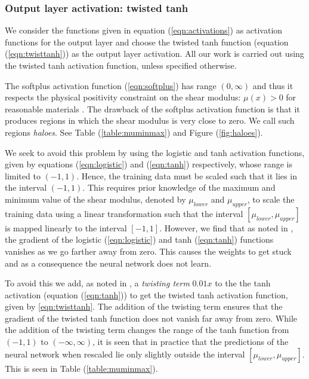 \documentclass[12pt]{article}
\begin{document}
\subsubsection{\label{sect:outputact} Output layer activation: twisted tanh}
We consider the functions given in equation (\ref{eqn:activations}) as activation functions for the output layer and choose the twisted tanh function (equation (\ref{eqn:twisttanh})) as the output layer activation. All our work is carried out using the twisted tanh activation function, unless specified otherwise.

The softplus activation function (\ref{eqn:softplus}) has range $(0,\infty)$ and thus it respects the physical positivity constraint on the shear modulus: $\mu(x)>0$ for reasonable materials \cite{book:segelmathcont}. The drawback of the softplus activation function is that it produces regions in which the shear modulus is very close to zero. We call such regions \textit{haloes}. See Table (\ref{table:muminmax}) and Figure (\ref{fig:haloes}).

We seek to avoid this problem by using the logistic and tanh activation functions, given by equations (\ref{eqn:logistic}) and (\ref{eqn:tanh}) respectively, whose range is limited to $(-1,1)$. Hence, the training data must be scaled such that it lies in the interval $(-1,1)$. This requires prior knowledge of the maximum and minimum value of the shear modulus, denoted by $\mu_{lower}$ and $\mu_{upper}$, to scale the training data using a linear transformation such that the interval $[\mu_{lower},\mu_{upper}]$ is mapped linearly to the interval $[-1,1]$. However, we find that as noted in \cite{bookchap:lecun98b}, the gradient of the logistic (\ref{eqn:logistic}) and tanh (\ref{eqn:tanh}) functions vanishes as we go farther away from zero. This causes the weights to get stuck and as a consequence the neural network does not learn.

To avoid this we add, as noted in \cite{bookchap:lecun98b}, a \textit{twisting term} $0.01x$ to the the tanh activation (equation (\ref{eqn:tanh})) to get the twisted tanh activation function, given by \ref{eqn:twisttanh}. The addition of the twisting term ensures that the gradient of the twisted tanh function does not vanish far away from zero. While the addition of the twisting term changes the range of the tanh function from $(-1,1)$ to $(-\infty,\infty)$, it is seen that in practice that the predictions of the neural network when rescaled lie only slightly outside the interval $[\mu_{lower},\mu_{upper}]$. This is seen in Table (\ref{table:muminmax}).
\end{document}
